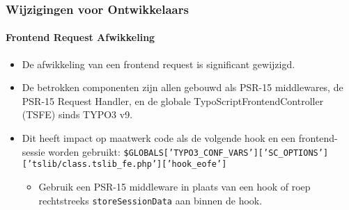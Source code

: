
\begin{frame}[fragile]
	\frametitle{Wijzigingen voor Ontwikkelaars}
	\framesubtitle{Frontend Request Afwikkeling}

	\lstset{basicstyle=\smaller\ttfamily}

	\begin{itemize}
		\item De afwikkeling van een frontend request is significant gewijzigd.

		\item De betrokken componenten zijn allen gebouwd als PSR-15 middlewares, de PSR-15 Request Handler,
			en de globale TypoScriptFrontendController (TSFE) sinds TYPO3 v9.

		\item Dit heeft impact op maatwerk code als de volgende hook en een frontend-sessie worden gebruikt:\newline
			{\fontsize{7}{8}\selectfont\texttt{\$GLOBALS['TYPO3\_CONF\_VARS']['SC\_OPTIONS']['tslib/class.tslib\_fe.php']['hook\_eofe']}}

			\begin{itemize}\smaller
				\item[\ding{228}] Gebruik een PSR-15 middleware in plaats van een hook of roep rechtstreeks
				\texttt{storeSessionData} aan binnen de hook.
			\end{itemize}\normalsize

	\end{itemize}

\end{frame}



